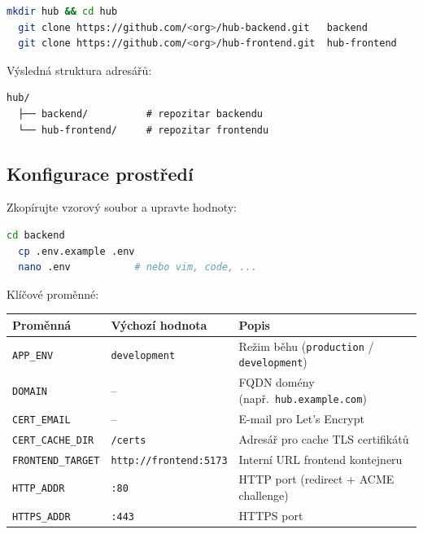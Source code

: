 \documentclass[12pt,a4paper]{article}
\begin{document}
\begin{lstlisting}[language=bash, caption={Klonovani repozitaru}]
  mkdir hub && cd hub
  git clone https://github.com/<org>/hub-backend.git   backend
  git clone https://github.com/<org>/hub-frontend.git  hub-frontend
\end{lstlisting}

Výsledná struktura adresářů:

\begin{lstlisting}[numbers=none]
  hub/
  ├── backend/          # repozitar backendu
  └── hub-frontend/     # repozitar frontendu
\end{lstlisting}

\subsection{Konfigurace prostředí}

Zkopírujte vzorový soubor a upravte hodnoty:

\begin{lstlisting}[language=bash]
  cd backend
  cp .env.example .env
  nano .env           # nebo vim, code, ...
\end{lstlisting}

Klíčové proměnné:

\begin{center}
\begin{tabular}{@{}lll@{}}
\toprule
\textbf{Proměnná} & \textbf{Výchozí hodnota} & \textbf{Popis} \\
\midrule
\texttt{APP\_ENV}          & \texttt{development}           & Režim běhu (\texttt{production} / \texttt{development}) \\
\texttt{DOMAIN}            & --                             & FQDN domény (např.\ \texttt{hub.example.com}) \\
\texttt{CERT\_EMAIL}       & --                             & E-mail pro Let's Encrypt \\
\texttt{CERT\_CACHE\_DIR}  & \texttt{/certs}                & Adresář pro cache TLS certifikátů \\
\texttt{FRONTEND\_TARGET}  & \texttt{http://frontend:5173}  & Interní URL frontend kontejneru \\
\texttt{HTTP\_ADDR}        & \texttt{:80}                   & HTTP port (redirect + ACME challenge) \\
\texttt{HTTPS\_ADDR}       & \texttt{:443}                  & HTTPS port \\
\bottomrule
\end{tabular}
\end{center}
\end{document}
